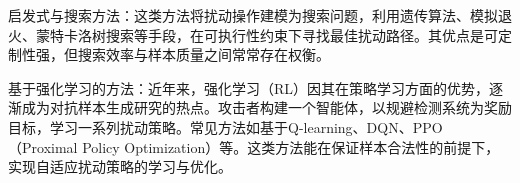 启发式与搜索方法：这类方法将扰动操作建模为搜索问题，利用遗传算法\cite{wang2022black}、模拟退火\cite{bertsimas1993simulated}、蒙特卡洛树搜索\cite{chaslot2010monte}等手段，在可执行性约束下寻找最佳扰动路径。其优点是可定制性强，但搜索效率与样本质量之间常常存在权衡。


基于强化学习的方法：近年来，强化学习（RL）因其在策略学习方面的优势，逐渐成为对抗样本生成研究的热点。攻击者构建一个智能体，以规避检测系统为奖励目标，学习一系列扰动策略。常见方法如基于Q-learning\cite{watkins1992q}、DQN\cite{osband2016deep}、PPO\cite{yu2022surprising}（Proximal Policy Optimization）等。这类方法能在保证样本合法性的前提下，实现自适应扰动策略的学习与优化。




